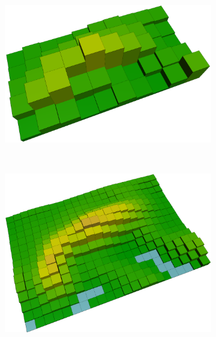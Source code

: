 \begin{figure}
    \centering
    \begin{subfigure}{0.4\textheight}
        \includegraphics[width=\textwidth]{figures/topo_av/EI_3d}
    \end{subfigure}\\
    \begin{subfigure}{0.4\textheight}
        \includegraphics[width=\textwidth]{figures/topo_av/50_3d}
    \end{subfigure}\\
    \begin{subfigure}{0.4\textheight}

\end{subfigure}
\end{figure}
